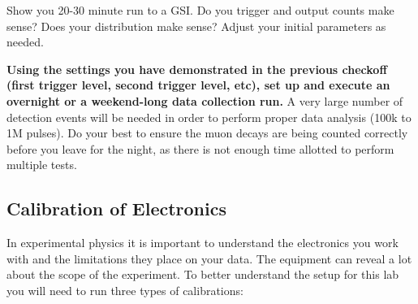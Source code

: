 \documentclass{../lab}
\begin{document}

 {Show you 20-30 minute run to a GSI. Do you trigger and output counts make sense? Does your distribution make sense? Adjust your initial parameters as needed.}

\textbf{Using the settings you have demonstrated in the previous checkoff (first trigger level, second trigger level, etc), set up and execute an overnight or a weekend-long data collection run.} A very large number of detection events will be needed in order to perform proper data analysis (100k to 1M pulses). Do your best to ensure the muon decays are being counted correctly before you leave for the night, as there is not enough time allotted to perform multiple tests.

\subsection{Calibration of Electronics}

In experimental physics it is important to understand the electronics you work with and the limitations they place on your data. The equipment can reveal a lot about the scope of the experiment. To better understand the setup for this lab you will need to run three types of calibrations:
\end{document}

